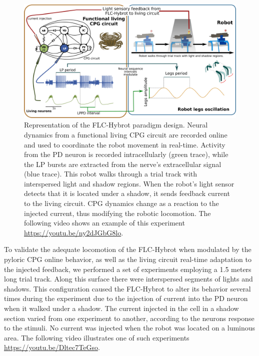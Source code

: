 \begin{figure}[hbt!]
	\begin{center}
		\includegraphics[width=\textwidth]{img/invariants/robot/Figure1_experiment_design_v1.png}
	\end{center}
	\caption{Representation of the FLC-Hybrot paradigm design. Neural dynamics from a functional living CPG circuit are recorded online and used to coordinate the robot movement in real-time. Activity from the PD neuron is recorded intracellularly (green trace), while the LP bursts are extracted from the nerve's extracellular signal (blue trace). This robot walks through a trial track with interspersed light and shadow regions. When the robot's light sensor detects that it is located under a shadow, it sends feedback current to the living circuit. CPG dynamics change as a reaction to the injected current, thus modifying the robotic locomotion. The following video shows an example of this experiment \url{https://youtu.be/ny2dJGbG8lo}.}
	\label{fig:robot_results_summary}
\end{figure}


To validate the adequate locomotion of the FLC-Hybrot when modulated by the pyloric CPG online behavior, as well as the living circuit real-time adaptation to the injected feedback, we performed a set of experiments employing a 1.5 meters long trial track. Along this surface there were interspersed segments of lights and shadows. This configuration caused the FLC-Hybrot to alter its behavior several times during the experiment due to the injection of current into the PD neuron when it walked under a shadow. The current injected in the cell in a shadow section varied from one experiment to another, according to the neurons response to the stimuli. No current was injected when the robot was located on a luminous area. The following video illustrates one of such experiments \url{https://youtu.be/Dltec7TeGso}.

